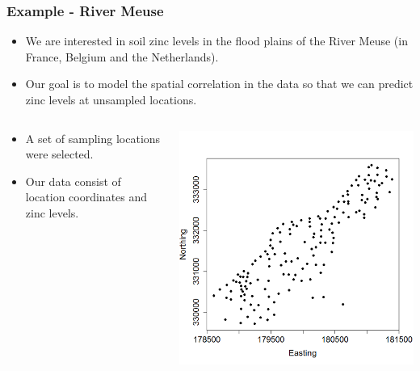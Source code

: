 \documentclass[parskip,12pt]{beamer}
\begin{document}
\begin{frame}
\frametitle{Example - River Meuse}
 \begin{itemize}
\item We are interested in soil zinc levels in the flood plains of the River Meuse (in France, Belgium and the Netherlands).\\
\vspace{3mm}
\item Our goal is to model the spatial correlation in the data so that we can predict zinc levels at unsampled locations.
\end{itemize}
\vspace{-5mm}
\begin{columns}
\begin{column}{0.45\textwidth}
  \begin{itemize}
\item A set of sampling locations were selected.
\vspace{2mm}
\item Our data consist of location coordinates and zinc levels.
\end{itemize}
\end{column}
\begin{column}{0.45\textwidth}
    \begin{center}
     \includegraphics[width=\textwidth]{MeuseSamples}
          \end{center}
\end{column}
\end{columns}
\end{frame}
\end{document}
